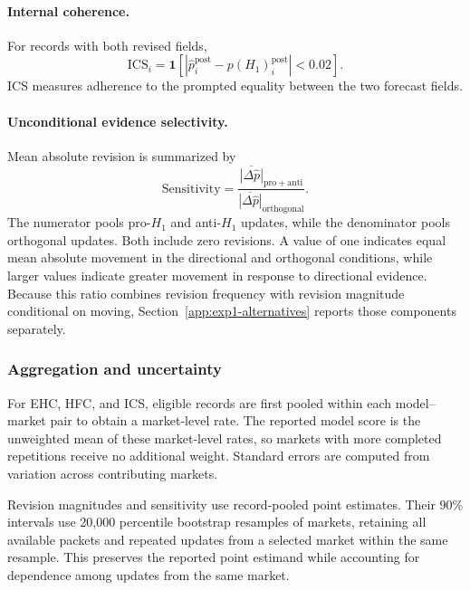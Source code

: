 \paragraph{Internal coherence.}
For records with both revised fields,
\begin{equation}
\mathrm{ICS}_i=\mathbf{1}\!\left[\left|\hat p_i^{\mathrm{post}}-p(H_1)_i^{\mathrm{post}}\right|<0.02\right].
\label{eq:ics}
\end{equation}
ICS measures adherence to the prompted equality between the two forecast fields.

\paragraph{Unconditional evidence selectivity.}
Mean absolute revision is summarized by
\begin{equation}
\mathrm{Sensitivity}=
\frac{\overline{|\Delta\hat p|}_{\mathrm{pro}+\mathrm{anti}}}
{\overline{|\Delta\hat p|}_{\mathrm{orthogonal}}}.
\label{eq:sensitivity}
\end{equation}
The numerator pools pro-$H_1$ and anti-$H_1$ updates, while the denominator pools orthogonal updates.
Both include zero revisions.
A value of one indicates equal mean absolute movement in the directional and orthogonal conditions, while larger values indicate greater movement in response to directional evidence.
Because this ratio combines revision frequency with revision magnitude conditional on moving, Section~\ref{app:exp1-alternatives} reports those components separately.

\subsubsection{Aggregation and uncertainty}
\label{app:aggregation}

For EHC, HFC, and ICS, eligible records are first pooled within each model--market pair to obtain a market-level rate.
The reported model score is the unweighted mean of these market-level rates, so markets with more completed repetitions receive no additional weight.
Standard errors are computed from variation across contributing markets.

Revision magnitudes and sensitivity use record-pooled point estimates.
Their 90\% intervals use 20,000 percentile bootstrap resamples of markets, retaining all available packets and repeated updates from a selected market within the same resample.
This preserves the reported point estimand while accounting for dependence among updates from the same market.


